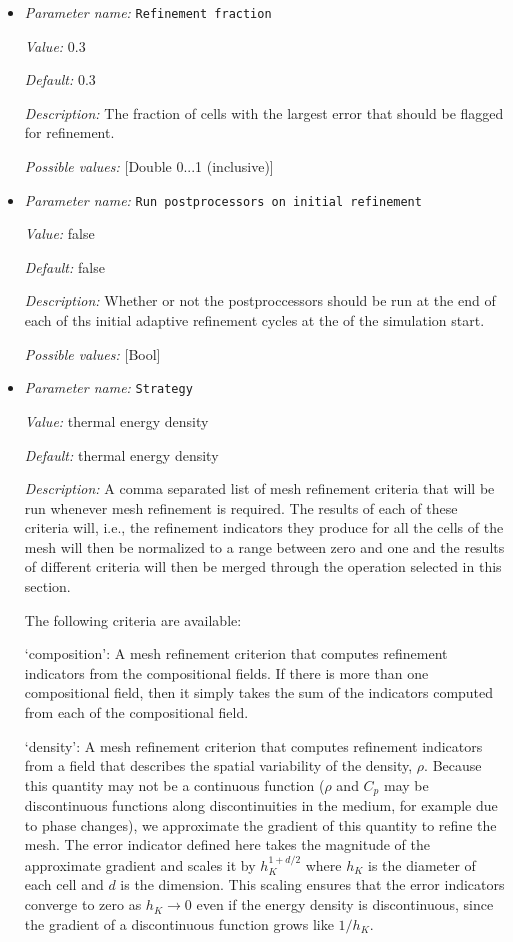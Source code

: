 \begin{itemize}
{\it Possible values:} [List list of <[Double 0...1.79769e+308 (inclusive)]> of length 0...4294967295 (inclusive)]
\item {\it Parameter name:} {\tt Refinement fraction}


{\it Value:} 0.3


{\it Default:} 0.3


{\it Description:} The fraction of cells with the largest error that should be flagged for refinement.


{\it Possible values:} [Double 0...1 (inclusive)]
\item {\it Parameter name:} {\tt Run postprocessors on initial refinement}


{\it Value:} false


{\it Default:} false


{\it Description:} Whether or not the postproccessors should be run at the end of each of ths initial adaptive refinement cycles at the of the simulation start.


{\it Possible values:} [Bool]
\item {\it Parameter name:} {\tt Strategy}


{\it Value:} thermal energy density


{\it Default:} thermal energy density


{\it Description:} A comma separated list of mesh refinement criteria that will be run whenever mesh refinement is required. The results of each of these criteria will, i.e., the refinement indicators they produce for all the cells of the mesh will then be normalized to a range between zero and one and the results of different criteria will then be merged through the operation selected in this section.

The following criteria are available:

`composition': A mesh refinement criterion that computes refinement indicators from the compositional fields. If there is more than one compositional field, then it simply takes the sum of the indicators computed from each of the compositional field.

`density': A mesh refinement criterion that computes refinement indicators from a field that describes the spatial variability of the density, $\rho$. Because this quantity may not be a continuous function ($\rho$ and $C_p$ may be discontinuous functions along discontinuities in the medium, for example due to phase changes), we approximate the gradient of this quantity to refine the mesh. The error indicator defined here takes the magnitude of the approximate gradient and scales it by $h_K^{1+d/2}$ where $h_K$ is the diameter of each cell and $d$ is the dimension. This scaling ensures that the error indicators converge to zero as $h_K\rightarrow 0$ even if the energy density is discontinuous, since the gradient of a discontinuous function grows like $1/h_K$.


\end{itemize}

